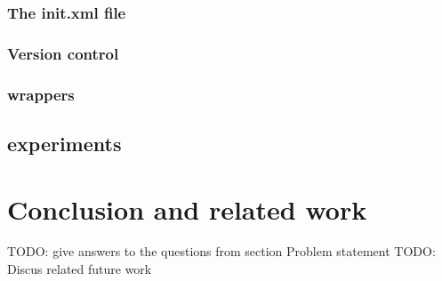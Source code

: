 \documentclass[a4paper,10pt]{scrartcl}
\begin{document}
\subsubsection{The init.xml file}
\label{subsec:init}

\subsubsection{Version control}
\label{subsec:versionControl}

\subsubsection{wrappers}
\label{subsec:wrappers}

\subsection{experiments}
\label{sec:experiments}

\newpage

\section{Conclusion and related work}
\label{sec:conclusion}
TODO: give answers to the questions from section Problem statement
TODO: Discus related future work
\newpage


\end{document}
